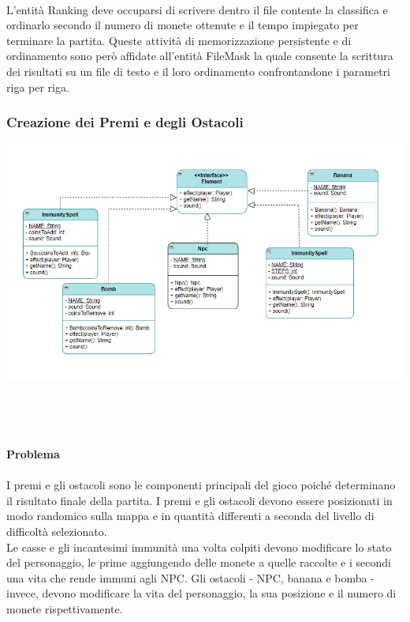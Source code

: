 \documentclass[12pt, letterpaper]{article}
\begin{document}
            \\
            L'entità Ranking deve occuparsi di scrivere dentro il file contente la classifica e ordinarlo secondo il numero di monete ottenute e il tempo impiegato per terminare la partita. Queste attività di memorizzazione persistente e di ordinamento sono però affidate all'entità FileMask la quale consente la scrittura dei risultati su un file di testo e il loro ordinamento confrontandone i parametri riga per riga.
        \subsubsection{Creazione dei Premi e degli Ostacoli}
            \includegraphics[width=\textwidth]{element.png}
            \\ \\ \\ \\ \\
            \textbf{Problema}
            \\ \\
            I premi e gli ostacoli sono le componenti principali del gioco poiché determinano il risultato finale della partita. I premi e gli ostacoli devono essere posizionati in modo randomico sulla mappa e in quantità differenti a seconda del livello di difficoltà selezionato. \\
            Le casse e gli incantesimi immunità una volta colpiti devono modificare lo stato del personaggio, le prime aggiungendo delle monete a quelle raccolte e i secondi una vita che rende immuni agli NPC. Gli ostacoli - NPC, banana e bomba - invece, devono modificare la vita del personaggio, la sua posizione e il numero di monete rispettivamente.
            \\ \\
\end{document}
